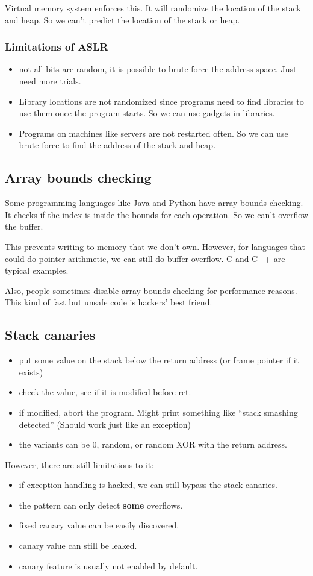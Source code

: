 \documentclass[letterpaper,12pt]{article}
\begin{document}
Virtual memory system enforces this. It will randomize the location of the
stack and heap. So we can't predict the location of the stack or heap.

\subsubsection{Limitations of ASLR}
\begin{itemize}
    \item not all bits are random, it is possible to brute-force the address space. Just
          need more trials.
    \item Library locations are not randomized since programs need to find libraries to
          use them once the program starts. So we can use gadgets in libraries.
    \item Programs on machines like servers are not restarted often. So we can use
          brute-force to find the address of the stack and heap.
\end{itemize}
\subsection{Array bounds checking}
Some programming languages like Java and Python have array bounds checking. It
checks if the index is inside the bounds for each operation. So we can't
overflow the buffer.

This prevents writing to memory that we don't own. However, for languages that
could do pointer arithmetic, we can still do buffer overflow. C and C++ are
typical examples.

Also, people sometimes disable array bounds checking for performance reasons.
This kind of fast but unsafe code is hackers' best friend.

\subsection{Stack canaries}
\begin{itemize}
    \item put some value on the stack below the return address (or frame pointer if it
          exists)
    \item check the value, see if it is modified before ret.
    \item if modified, abort the program. Might print something like ``stack smashing
          detected'' (Should work just like an exception)
    \item the variants can be 0, random, or random XOR with the return address.
\end{itemize}
However, there are still limitations to it:\begin{itemize}
    \item if exception handling is hacked, we can still bypass the stack canaries.
    \item the pattern can only detect \textbf{some} overflows.
    \item fixed canary value can be easily discovered.
    \item canary value can still be leaked.
    \item canary feature is usually not enabled by default.
\end{itemize}
\end{document}
